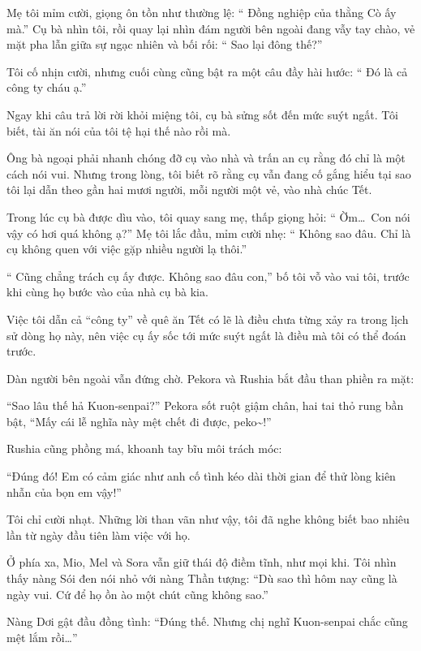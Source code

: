 \documentclass[../main.tex]{subfiles}
\begin{document}
Mẹ tôi mỉm cười, giọng ôn tồn như thường lệ: ``{\color{red} Đồng nghiệp của thằng Cò ấy mà.}'' Cụ bà nhìn tôi, rồi quay lại nhìn đám người bên ngoài đang vẫy tay chào, vẻ mặt pha lẫn giữa sự ngạc nhiên và bối rối: ``{\color{red} Sao lại đông thế?}''

Tôi cố nhịn cười, nhưng cuối cùng cũng bật ra một câu đầy hài hước: ``{\color{red} Đó là cả công ty cháu ạ.}''

Ngay khi câu trả lời rời khỏi miệng tôi, cụ bà sửng sốt đến mức suýt ngất. Tôi biết, tài ăn nói của tôi tệ hại thế nào rồi mà.

Ông bà ngoại phải nhanh chóng đỡ cụ vào nhà và trấn an cụ rằng đó chỉ là một cách nói vui. Nhưng trong lòng, tôi biết rõ rằng cụ vẫn đang cố gắng hiểu tại sao tôi lại dẫn theo gần hai mươi người, mỗi người một vẻ, vào nhà chúc Tết.


Trong lúc cụ bà được dìu vào, tôi quay sang mẹ, thấp giọng hỏi: ``{\color{red} Ờm\dots\ Con nói vậy có hơi quá không ạ?}'' Mẹ tôi lắc đầu, mỉm cười nhẹ: ``{\color{red} Không sao đâu. Chỉ là cụ không quen với việc gặp nhiều người lạ thôi.}''

``{\color{red} Cũng chẳng trách cụ ấy được. Không sao đâu con,}'' bố tôi vỗ vào vai tôi, trước khi cùng họ bước vào của nhà cụ bà kia.

Việc tôi dẫn cả ``công ty'' về quê ăn Tết có lẽ là điều chưa từng xảy ra trong lịch sử dòng họ này, nên việc cụ ấy sốc tới mức suýt ngất là điều mà tôi có thể đoán trước.

Dàn người bên ngoài vẫn đứng chờ. Pekora và Rushia bắt đầu than phiền ra mặt:

``Sao lâu thế hả Kuon-senpai?'' Pekora sốt ruột giậm chân, hai tai thỏ rung bần bật, ``Mấy cái lễ nghĩa này mệt chết đi được, peko\~{}!''

Rushia cũng phồng má, khoanh tay bĩu môi trách móc:

``Đúng đó! Em có cảm giác như anh cố tình kéo dài thời gian để thử lòng kiên nhẫn của bọn em vậy!''

Tôi chỉ cười nhạt. Những lời than vãn như vậy, tôi đã nghe không biết bao nhiêu lần từ ngày đầu tiên làm việc với họ.

Ở phía xa, Mio, Mel và Sora vẫn giữ thái độ điềm tĩnh, như mọi khi. Tôi nhìn thấy nàng Sói đen nói nhỏ với nàng Thần tượng: ``Dù sao thì hôm nay cũng là ngày vui. Cứ để họ ồn ào một chút cũng không sao.''

Nàng Dơi gật đầu đồng tình: ``Đúng thế. Nhưng chị nghĩ Kuon-senpai chắc cũng mệt lắm rồi\dots''
\end{document}
